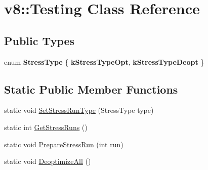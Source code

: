 \hypertarget{classv8_1_1Testing}{\section{v8\-:\-:Testing Class Reference}
\label{classv8_1_1Testing}
}
\subsection*{Public Types}
\begin{DoxyCompactItemize}
\item 
enum {\bfseries Stress\-Type} \{ {\bfseries k\-Stress\-Type\-Opt}, 
{\bfseries k\-Stress\-Type\-Deopt}
 \}
\end{DoxyCompactItemize}
\subsection*{Static Public Member Functions}
\begin{DoxyCompactItemize}
\item 
static void \hyperlink{classv8_1_1Testing_aafa5a4917998aa64134aa750ce5c4b2e}{Set\-Stress\-Run\-Type} (Stress\-Type type)
\item 
static int \hyperlink{classv8_1_1Testing_adc876063b1e07462b8d9544dd8efab36}{Get\-Stress\-Runs} ()
\item 
static void \hyperlink{classv8_1_1Testing_ab9da044b18b9d05770b655bed27ed7f4}{Prepare\-Stress\-Run} (int run)
\item 
static void \hyperlink{classv8_1_1Testing_ae541bd8d75667db1d83c8aef7f8c1cf3}{Deoptimize\-All} ()
\end{DoxyCompactItemize}



